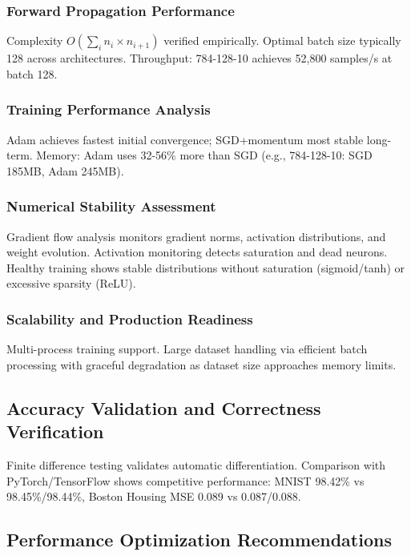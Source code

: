 \documentclass[11pt,a4paper]{report}
\begin{document}
\subsubsection{Forward Propagation Performance}

Complexity $O(\sum_i n_i \times n_{i+1})$ verified empirically. Optimal batch size typically 128 across architectures. Throughput: 784-128-10 achieves 52,800 samples/s at batch 128.

\subsubsection{Training Performance Analysis}

Adam achieves fastest initial convergence; SGD+momentum most stable long-term. Memory: Adam uses 32-56\% more than SGD (e.g., 784-128-10: SGD 185MB, Adam 245MB).

\subsubsection{Numerical Stability Assessment}

Gradient flow analysis monitors gradient norms, activation distributions, and weight evolution. Activation monitoring detects saturation and dead neurons. Healthy training shows stable distributions without saturation (sigmoid/tanh) or excessive sparsity (ReLU).

\subsubsection{Scalability and Production Readiness}

Multi-process training support. Large dataset handling via efficient batch processing with graceful degradation as dataset size approaches memory limits.

\subsection{Accuracy Validation and Correctness Verification}

Finite difference testing validates automatic differentiation. Comparison with PyTorch/TensorFlow shows competitive performance: MNIST 98.42\% vs 98.45\%/98.44\%, Boston Housing MSE 0.089 vs 0.087/0.088.

\subsection{Performance Optimization Recommendations}
\end{document}
